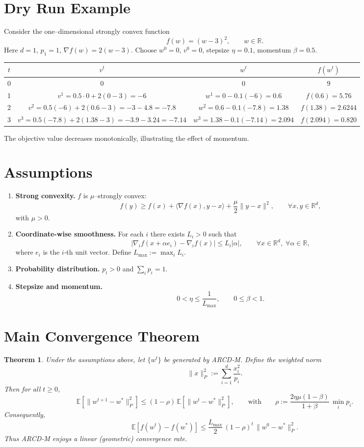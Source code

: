 \documentclass{article}
\newcommand{\E}{\mathbb{E}}
\newcommand{\R}{\mathbb{R}}
\newtheorem{theorem}{Theorem}
\begin{document}
\section*{Dry Run Example}
Consider the one–dimensional strongly convex function
\[
f(w) = (w-3)^{2},\qquad w\in\R .
\]
Here $d=1$, $p_{1}=1$, $\nabla f(w)=2(w-3)$.  
Choose $w^{0}=0$, $v^{0}=0$, stepsize $\eta=0.1$, momentum $\beta=0.5$.

\begin{center}
\begin{tabular}{c|c|c|c}
$t$ & $v^{t}$ & $w^{t}$ & $f(w^{t})$\\ \hline
0 & $0$ & $0$ & $9$\\
1 & $v^{1}=0.5\cdot0+2(0-3)=-6$ & $w^{1}=0-0.1(-6)=0.6$ & $f(0.6)=5.76$\\
2 & $v^{2}=0.5(-6)+2(0.6-3)=-3-4.8=-7.8$ & $w^{2}=0.6-0.1(-7.8)=1.38$ & $f(1.38)=2.6244$\\
3 & $v^{3}=0.5(-7.8)+2(1.38-3)=-3.9-3.24=-7.14$ & $w^{3}=1.38-0.1(-7.14)=2.094$ & $f(2.094)=0.820$\\
\end{tabular}
\end{center}
The objective value decreases monotonically, illustrating the effect of momentum.

\newpage
\section*{Assumptions}
\begin{enumerate}
\item \textbf{Strong convexity.} $f$ is $\mu$–strongly convex:
\[
f(y)\ge f(x)+\langle\nabla f(x),y-x\rangle+\frac{\mu}{2}\|y-x\|^{2},
\qquad\forall x,y\in\R^{d},
\]
with $\mu>0$.
\item \textbf{Coordinate-wise smoothness.} For each $i$ there exists $L_i>0$ such that
\[
\bigl| \nabla_i f(x+ \alpha e_i)-\nabla_i f(x) \bigr|\le L_i |\alpha|,
\qquad\forall x\in\R^{d},\;\forall \alpha\in\R,
\]
where $e_i$ is the $i$‑th unit vector. Define $L_{\max}:=\max_i L_i$.
\item \textbf{Probability distribution.} $p_i>0$ and $\sum_i p_i=1$.
\item \textbf{Stepsize and momentum.}
\[
0<\eta\le \frac{1}{L_{\max}},\qquad 0\le\beta<1.
\]
\end{enumerate}

\section*{Main Convergence Theorem}
\begin{theorem}\label{thm:linear}
Under the assumptions above, let $\{w^{t}\}$ be generated by ARCD‑M. Define the weighted norm
\[
\|x\|_{P}^{2}:=\sum_{i=1}^{d}\frac{x_i^{2}}{p_i}.
\]
Then for all $t\ge 0$,
\[
\E\!\left[ \|w^{t+1}-w^{*}\|_{P}^{2}\right]
\le \left(1-\rho\right)\,\E\!\left[ \|w^{t}-w^{*}\|_{P}^{2}\right],
\qquad\text{with}\qquad
\rho:=\frac{2\eta\mu(1-\beta)}{1+\beta}\,\min_{i}p_i .
\]
Consequently,
\[
\E\!\left[ f(w^{t})-f(w^{*})\right]\le
\frac{L_{\max}}{2}\,(1-\rho)^{t}\,\|w^{0}-w^{*}\|_{P}^{2}.
\]
Thus ARCD‑M enjoys a linear (geometric) convergence rate.
\end{theorem}
\end{document}
